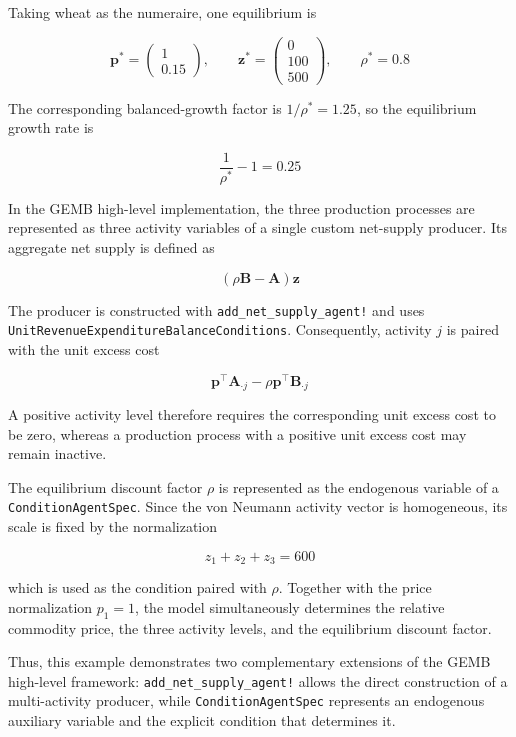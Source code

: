 \documentclass[
  letterpaper,
  DIV=11,
  numbers=noendperiod]{scrreprt}
\begin{document}
Taking wheat as the numeraire, one equilibrium is

\[
\mathbf p^*=
\begin{pmatrix}
1\\
0.15
\end{pmatrix},
\qquad
\mathbf z^*=
\begin{pmatrix}
0\\
100\\
500
\end{pmatrix},
\qquad
\rho^*=0.8
\]

The corresponding balanced-growth factor is \(1/\rho^*=1.25\), so the
equilibrium growth rate is

\[
\frac{1}{\rho^*}-1=0.25
\]

In the GEMB high-level implementation, the three production processes
are represented as three activity variables of a single custom
net-supply producer. Its aggregate net supply is defined as

\[
(\rho\mathbf B-\mathbf A)\mathbf z
\]

The producer is constructed with \texttt{add\_net\_supply\_agent!} and
uses \texttt{UnitRevenueExpenditureBalanceConditions}. Consequently,
activity \(j\) is paired with the unit excess cost

\[
\mathbf p^\top\mathbf A_{\cdot j}
-
\rho\mathbf p^\top\mathbf B_{\cdot j}
\]

A positive activity level therefore requires the corresponding unit
excess cost to be zero, whereas a production process with a positive
unit excess cost may remain inactive.

The equilibrium discount factor \(\rho\) is represented as the
endogenous variable of a \texttt{ConditionAgentSpec}. Since the von
Neumann activity vector is homogeneous, its scale is fixed by the
normalization

\[
z_1+z_2+z_3=600
\]

which is used as the condition paired with \(\rho\). Together with the
price normalization \(p_1=1\), the model simultaneously determines the
relative commodity price, the three activity levels, and the equilibrium
discount factor.

Thus, this example demonstrates two complementary extensions of the GEMB
high-level framework: \texttt{add\_net\_supply\_agent!} allows the
direct construction of a multi-activity producer, while
\texttt{ConditionAgentSpec} represents an endogenous auxiliary variable
and the explicit condition that determines it.
\end{document}
